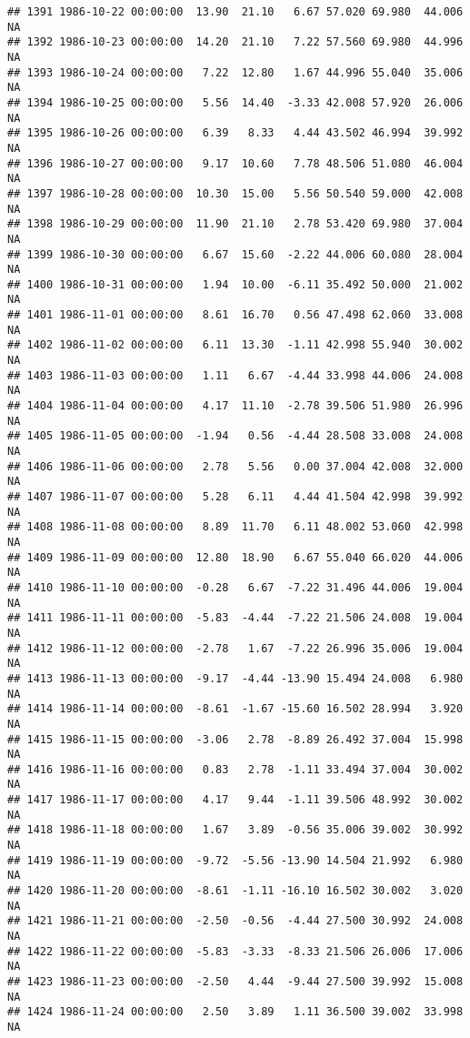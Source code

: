 \documentclass{article}\usepackage{graphicx, color}
\makeatletter
\newenvironment{kframe}{%
 \def\at@end@of@kframe{}%
 \ifinner\ifhmode%
  \def\at@end@of@kframe{\end{minipage}}%
  \begin{minipage}{\columnwidth}%
 \fi\fi%
 \def\FrameCommand##1{\hskip\@totalleftmargin \hskip-\fboxsep
 \colorbox{shadecolor}{##1}\hskip-\fboxsep
     \hskip-\linewidth \hskip-\@totalleftmargin \hskip\columnwidth}%
 \MakeFramed {\advance\hsize-\width
   \@totalleftmargin\z@ \linewidth\hsize
   \@setminipage}}%
 {\par\unskip\endMakeFramed%
 \at@end@of@kframe}
\newenvironment{knitrout}{}{} %
\makeatother
\begin{document}
\begin{knitrout}
\begin{kframe}
\begin{verbatim}
## 1391 1986-10-22 00:00:00  13.90  21.10   6.67 57.020 69.980  44.006     NA
## 1392 1986-10-23 00:00:00  14.20  21.10   7.22 57.560 69.980  44.996     NA
## 1393 1986-10-24 00:00:00   7.22  12.80   1.67 44.996 55.040  35.006     NA
## 1394 1986-10-25 00:00:00   5.56  14.40  -3.33 42.008 57.920  26.006     NA
## 1395 1986-10-26 00:00:00   6.39   8.33   4.44 43.502 46.994  39.992     NA
## 1396 1986-10-27 00:00:00   9.17  10.60   7.78 48.506 51.080  46.004     NA
## 1397 1986-10-28 00:00:00  10.30  15.00   5.56 50.540 59.000  42.008     NA
## 1398 1986-10-29 00:00:00  11.90  21.10   2.78 53.420 69.980  37.004     NA
## 1399 1986-10-30 00:00:00   6.67  15.60  -2.22 44.006 60.080  28.004     NA
## 1400 1986-10-31 00:00:00   1.94  10.00  -6.11 35.492 50.000  21.002     NA
## 1401 1986-11-01 00:00:00   8.61  16.70   0.56 47.498 62.060  33.008     NA
## 1402 1986-11-02 00:00:00   6.11  13.30  -1.11 42.998 55.940  30.002     NA
## 1403 1986-11-03 00:00:00   1.11   6.67  -4.44 33.998 44.006  24.008     NA
## 1404 1986-11-04 00:00:00   4.17  11.10  -2.78 39.506 51.980  26.996     NA
## 1405 1986-11-05 00:00:00  -1.94   0.56  -4.44 28.508 33.008  24.008     NA
## 1406 1986-11-06 00:00:00   2.78   5.56   0.00 37.004 42.008  32.000     NA
## 1407 1986-11-07 00:00:00   5.28   6.11   4.44 41.504 42.998  39.992     NA
## 1408 1986-11-08 00:00:00   8.89  11.70   6.11 48.002 53.060  42.998     NA
## 1409 1986-11-09 00:00:00  12.80  18.90   6.67 55.040 66.020  44.006     NA
## 1410 1986-11-10 00:00:00  -0.28   6.67  -7.22 31.496 44.006  19.004     NA
## 1411 1986-11-11 00:00:00  -5.83  -4.44  -7.22 21.506 24.008  19.004     NA
## 1412 1986-11-12 00:00:00  -2.78   1.67  -7.22 26.996 35.006  19.004     NA
## 1413 1986-11-13 00:00:00  -9.17  -4.44 -13.90 15.494 24.008   6.980     NA
## 1414 1986-11-14 00:00:00  -8.61  -1.67 -15.60 16.502 28.994   3.920     NA
## 1415 1986-11-15 00:00:00  -3.06   2.78  -8.89 26.492 37.004  15.998     NA
## 1416 1986-11-16 00:00:00   0.83   2.78  -1.11 33.494 37.004  30.002     NA
## 1417 1986-11-17 00:00:00   4.17   9.44  -1.11 39.506 48.992  30.002     NA
## 1418 1986-11-18 00:00:00   1.67   3.89  -0.56 35.006 39.002  30.992     NA
## 1419 1986-11-19 00:00:00  -9.72  -5.56 -13.90 14.504 21.992   6.980     NA
## 1420 1986-11-20 00:00:00  -8.61  -1.11 -16.10 16.502 30.002   3.020     NA
## 1421 1986-11-21 00:00:00  -2.50  -0.56  -4.44 27.500 30.992  24.008     NA
## 1422 1986-11-22 00:00:00  -5.83  -3.33  -8.33 21.506 26.006  17.006     NA
## 1423 1986-11-23 00:00:00  -2.50   4.44  -9.44 27.500 39.992  15.008     NA
## 1424 1986-11-24 00:00:00   2.50   3.89   1.11 36.500 39.002  33.998     NA

\end{verbatim}
\end{kframe}
\end{knitrout}
\end{document}

